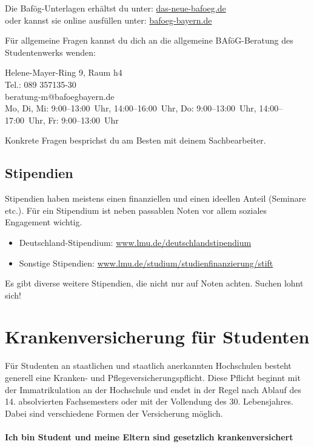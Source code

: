 \documentclass[twoside,12pt,parskip=half-]{scrartcl}
\begin{document}
Die Bafög-Unterlagen erhältst du unter: \url{das-neue-bafoeg.de}\\
oder kannst sie online ausfüllen unter: \url{bafoeg-bayern.de}

Für allgemeine Fragen kannst du dich an die allgemeine BAföG-Beratung des Studentenwerks wenden:

Helene-Mayer-Ring 9, Raum h4\\
Tel.: 089 357135-30\\
beratung-m@bafoegbayern.de\\
Mo, Di, Mi: 9:00--13:00~Uhr, 14:00--16:00~Uhr, Do: 9:00--13:00~Uhr, 14:00--17:00~Uhr, Fr: 9:00--13:00~Uhr

Konkrete Fragen besprichst du am Besten mit deinem Sachbearbeiter.

\subsection{Stipendien}
Stipendien haben meistens einen finanziellen und einen ideellen Anteil
(Seminare etc.). Für ein Stipendium ist neben passablen Noten vor
allem soziales Engagement wichtig.

\begin{itemize}
	\item Deutschland-Stipendium: \url{www.lmu.de/deutschlandstipendium}
	\item Sonstige Stipendien: \url{www.lmu.de/studium/studienfinanzierung/stift}
\end{itemize}

Es gibt diverse weitere Stipendien, die nicht nur auf Noten achten.
Suchen lohnt sich!

\clearpage

\section{Krankenversicherung für Studenten}

Für Studenten an staatlichen und staatlich anerkannten Hochschulen
besteht generell eine Kranken- und Pflegeversicherungspflicht. Diese
Pflicht beginnt mit der Immatrikulation an der Hochschule und endet in
der Regel nach Ablauf des 14. absolvierten Fachsemesters oder mit der
Vollendung des 30. Lebensjahres. Dabei sind verschiedene Formen der
Versicherung möglich.

\paragraph{Ich bin Student und meine Eltern sind gesetzlich krankenversichert}
\end{document}
